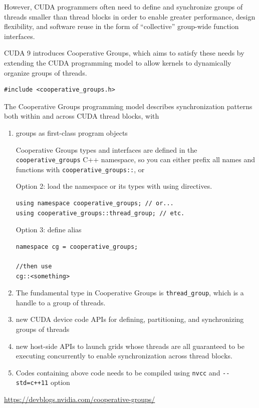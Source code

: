 However, CUDA programmers often need to define and synchronize groups of threads
smaller than thread blocks in order to enable greater performance, design
flexibility, and software reuse in the form of “collective” group-wide function
interfaces.

CUDA 9 introduces Cooperative Groups, which aims to satisfy these needs by
extending the CUDA programming model to allow kernels to dynamically organize
groups of threads.

\begin{lstlisting}
#include <cooperative_groups.h>

\end{lstlisting}

The Cooperative Groups programming model describes synchronization patterns both
within and across CUDA thread blocks, with 
\begin{enumerate}
  \item groups as first-class program objects
  
Cooperative Groups types and interfaces are defined in the \verb!cooperative_groups!
C++ namespace, so you can either prefix all names and functions with
\verb!cooperative_groups::!, or 

Option 2: load the namespace or its types with using directives.
\begin{lstlisting}
using namespace cooperative_groups; // or...
using cooperative_groups::thread_group; // etc.
\end{lstlisting}
  
Option 3: define alias 
\begin{verbatim}
namespace cg = cooperative_groups;

//then use
cg::<something>
\end{verbatim}

  \item  The fundamental type in Cooperative Groups is \verb!thread_group!, which is a handle to a group of threads. 


  \item  new CUDA device code APIs for defining, partitioning, and synchronizing
  groups of threads

  \item new host-side APIs to launch grids whose threads are all guaranteed to be
  executing concurrently to enable synchronization across thread blocks.
  
  
  \item Codes containing above code needs to be compiled using \verb!nvcc! and 
  \verb!--std=c++11! option
  
  
\end{enumerate}
\url{https://devblogs.nvidia.com/cooperative-groups/}

